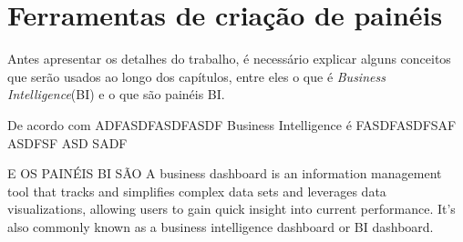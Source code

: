 \chapter{Ferramentas de criação de painéis}\label{cap_trabalho_academico}

Antes apresentar os detalhes do trabalho, é necessário explicar alguns conceitos que serão usados ao longo dos capítulos, entre eles o que é \textit{Business Intelligence}(BI) e o que são painéis BI.

De acordo com ADFASDFASDFASDF Business Intelligence é FASDFASDFSAF ASDFSF ASD SADF

E OS PAINÉIS BI SÃO A business dashboard is an information management tool that tracks and simplifies complex data sets and leverages data visualizations, allowing users to gain quick insight into current performance. It's also commonly known as a business intelligence dashboard or BI dashboard.
